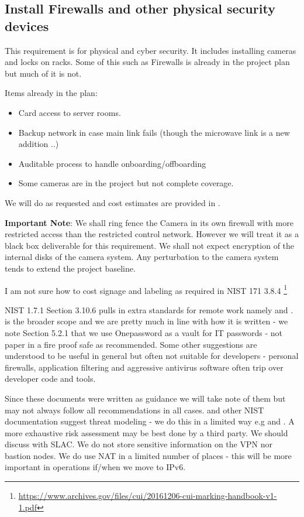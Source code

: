 
\subsection{Install Firewalls and other physical security devices} \label{sec:2firewalls}

This requirement is for physical and cyber security. It includes installing cameras and locks on racks.
Some of this such as Firewalls is already in the project plan but much of it is not.

Items already in the plan:
\begin{itemize}
\item Card access to server rooms.
\item Backup network in case main link fails (though the microwave link is a new addition ..)
\item Auditable process to handle onboarding/offboarding
\item Some cameras are in the project but not complete coverage.

\end{itemize}

We will do as requested and cost estimates are provided in .

{\bf Important Note}: We shall ring fence the Camera in its own firewall with more restricted access than the restricted control network.
However we will treat it as a black box deliverable for this requirement. We shall not expect encryption of the internal disks of the camera system. Any perturbation to the camera system tends to extend the project baseline.

I am not sure how to cost signage and labeling as required in NIST 171 3.8.4 \footnote{\url{https://www.archives.gov/files/cui/20161206-cui-marking-handbook-v1-1.pdf}}

NIST 1.7.1 Section 3.10.6 pulls in extra standards for remote work namely  and .
 is the broader scope and we are pretty much in line with how it is written - we note Section 5.2.1 that we use Onepassword as a vault for IT passwords - not paper in a fire proof safe as recommended.
Some other suggestions are understood to be useful in general but often not suitable for developers - personal firewalls, application filtering  and aggressive antivirus software often trip over developer code and tools.

Since these documents were written  as guidance we will take note of them but may not always follow all recommendations in all cases.
 and other NIST documentation suggest threat modeling - we do this in a limited way e.g  and . A more exhaustive risk assessment may be best done by a third party. We should discuss with SLAC.
We do not store sensitive information on the VPN nor bastion nodes.
We do use NAT in a limited number of places - this will be more important in operations if/when we move to IPv6.



